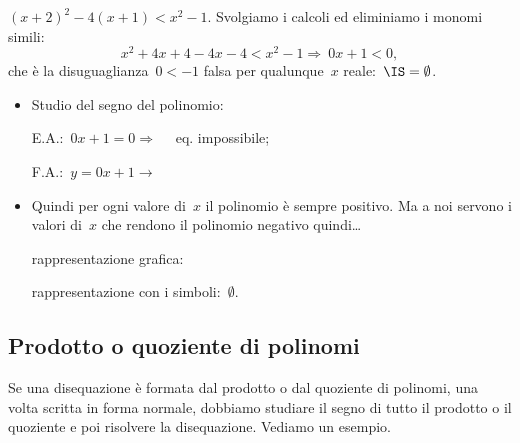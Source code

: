 \begin{esempio}
$(x+2)^2-4(x+1)<x^{2}-1.$
Svolgiamo i calcoli ed eliminiamo i monomi simili:
\[x^{2}+4x+4-4x-4<x^{2}-1\Rightarrow~0 x + 1 < 0,\]
che è la disuguaglianza~$0<-1$ falsa per qualunque~$x$ reale:~$\IS=\emptyset $.
\begin{itemize} [noitemsep]
 \item Studio del segno del polinomio:\\
 \begin{minipage}{.45\textwidth}
  E.A.:~$0 x + 1 = 0  \Rightarrow \quad $ eq. impossibile;
 \end{minipage}
 \begin{minipage}{.25\textwidth}
  F.A.:~$y=0 x + 1 \rightarrow $
 \end{minipage}
 \begin{minipage}{.3\textwidth}
  
 \end{minipage}
 \item Quindi per ogni valore di~$x$ il polinomio è sempre positivo. 
  Ma a noi servono i valori di~$x$ che rendono il polinomio negativo 
  quindi\dots
 \subitem 
  \begin{minipage}{.35\textwidth}
   rappresentazione grafica: 
  \end{minipage}
  \begin{minipage}{.30\textwidth}
   
  \end{minipage}
 \subitem rappresentazione con i simboli:~$\emptyset$. 
\end{itemize}
\end{esempio}

\subsection{Prodotto o quoziente di polinomi}
\label{sec:dis_prod_quo}

Se una disequazione è formata dal prodotto o dal quoziente di polinomi, 
una volta scritta in forma normale,
dobbiamo studiare il segno di tutto il prodotto o il quoziente e poi risolvere
la disequazione.
Vediamo un esempio.

